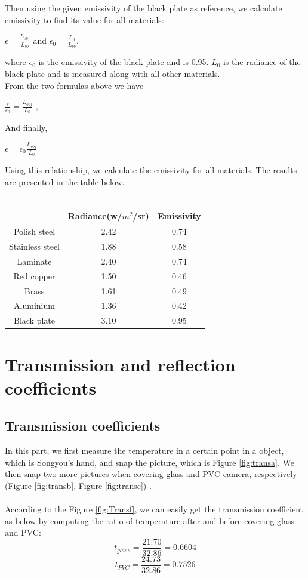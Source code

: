 \documentclass[english]{article}
\begin{document}
Then using the given emissivity of the black plate as reference, we calculate emissivity to find its value for all materials:\\
\begin{center}
$\epsilon = \frac{L_{obj}}{L_{bb}} $ and $\epsilon_{0} = \frac{L_{0}}{L_{bb}} $,
\end{center}
where $\epsilon_{0}$ is the emissivity of the black plate and is 0.95. $L_{0}$ is the radiance of the black plate and is measured along with all other materials.\\
From the two formulas above we have\\
\begin{center}
$\frac{\epsilon}{\epsilon_{0}} = \frac{L_{obj}}{L_{0}} $ ,
\end{center}
And finally,\\
\begin{center}
$\epsilon = \epsilon_{0} \frac{L_{obj}}{L_{0}} $

\end{center}
Using this relationship, we calculate the emissivity for all materials. 
The results are presented in the table below.\\
\\
\begin{center}
\begin{tabular}{|c|c|c|}
\hline 
 & Radiance(w/$m^{2}$/sr) & Emissivity\tabularnewline
\hline 
\hline 
Polish steel & 2.42 & 0.74\tabularnewline
\hline 
Stainless steel & 1.88 & 0.58\tabularnewline
\hline 
Laminate & 2.40 & 0.74\tabularnewline
\hline 
Red copper & 1.50 & 0.46\tabularnewline
\hline 
Brass & 1.61 & 0.49\tabularnewline
\hline 
Aluminium & 1.36 & 0.42\tabularnewline
\hline 
Black plate & 3.10 & 0.95\tabularnewline
\hline 
\end{tabular}
\end{center}

\section{Transmission and reflection coefficients}
\subsection{Transmission coefficients}
In this part, we first measure the temperature in a certain point in a object, which is Songyou's hand, and snap the picture, which is Figure \ref{fig:transa}.
We then snap two more pictures when covering glass and PVC  camera, respectively (Figure \ref{fig:transb}, Figure \ref{fig:transc}) .\\
\\
According to the Figure \ref{fig:Transf}, we can easily get the transmission coefficient as below by computing the ratio of temperature after and before covering glass and PVC:
$$
t_{glass} = \frac{21.70}{32.86} = 0.6604
$$
$$
t_{PVC} = \frac{24.73}{32.86} = 0.7526
$$
\end{document}
